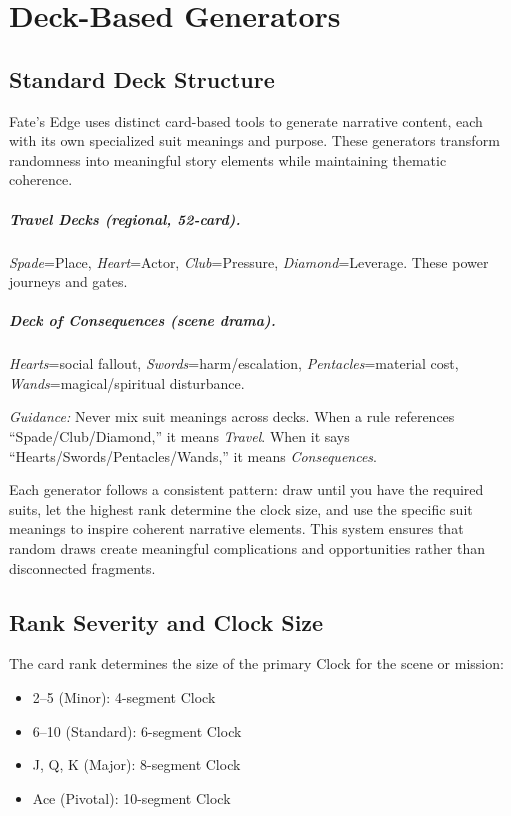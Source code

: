 \chapter{Deck-Based Generators}

\section{Standard Deck Structure}

Fate's Edge uses distinct card-based tools to generate narrative content, each with its own specialized suit meanings and purpose. These generators transform randomness into meaningful story elements while maintaining thematic coherence.

\paragraph{Travel Decks (regional, 52-card).}
\emph{Spade}=Place, \emph{Heart}=Actor, \emph{Club}=Pressure, \emph{Diamond}=Leverage. These power journeys and gates.

\paragraph{Deck of Consequences (scene drama).}
\emph{Hearts}=social fallout, \emph{Swords}=harm/escalation, \emph{Pentacles}=material cost, \emph{Wands}=magical/spiritual disturbance.

\textit{Guidance:} Never mix suit meanings across decks. When a rule references ``Spade/Club/Diamond,'' it means \emph{Travel}. When it says ``Hearts/Swords/Pentacles/Wands,'' it means \emph{Consequences}.

Each generator follows a consistent pattern: draw until you have the required suits, let the highest rank determine the clock size, and use the specific suit meanings to inspire coherent narrative elements. This system ensures that random draws create meaningful complications and opportunities rather than disconnected fragments.

\section{Rank Severity and Clock Size}

The card rank determines the size of the primary Clock for the scene or mission:

\begin{itemize}
\item 2--5 (Minor): 4-segment Clock
\item 6--10 (Standard): 6-segment Clock
\item J, Q, K (Major): 8-segment Clock
\item Ace (Pivotal): 10-segment Clock
\end{itemize}

